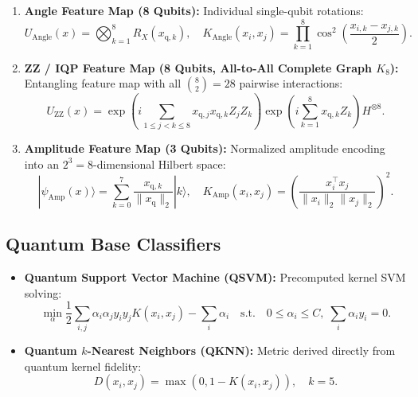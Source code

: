 \begin{enumerate}[leftmargin=*]
  \item \textbf{Angle Feature Map (8 Qubits):} Individual single-qubit rotations:
  \begin{equation}
  U_{\mathrm{Angle}}(x) = \bigotimes_{k=1}^8 R_X(x_{\mathrm{q}, k}), \quad K_{\mathrm{Angle}}(x_i, x_j) = \prod_{k=1}^8 \cos^2\left(\frac{x_{i, k} - x_{j, k}}{2}\right).
  \end{equation}
  \item \textbf{ZZ / IQP Feature Map (8 Qubits, All-to-All Complete Graph $K_8$):} Entangling feature map with all $\binom{8}{2}=28$ pairwise interactions:
  \begin{equation}
  U_{\mathrm{ZZ}}(x) = \exp\left(i \sum_{1 \le j < k \le 8} x_{\mathrm{q}, j} x_{\mathrm{q}, k} Z_j Z_k\right) \exp\left(i \sum_{k=1}^8 x_{\mathrm{q}, k} Z_k\right) H^{\otimes 8}.
  \end{equation}
  \item \textbf{Amplitude Feature Map (3 Qubits):} Normalized amplitude encoding into an $2^3 = 8$-dimensional Hilbert space:
  \begin{equation}
  |\psi_{\mathrm{Amp}}(x)\rangle = \sum_{k=0}^7 \frac{x_{\mathrm{q}, k}}{\|x_{\mathrm{q}}\|_2} |k\rangle, \quad K_{\mathrm{Amp}}(x_i, x_j) = \left(\frac{x_i^\top x_j}{\|x_i\|_2 \|x_j\|_2}\right)^2.
  \end{equation}
\end{enumerate}

\subsection{Quantum Base Classifiers}
\begin{itemize}[leftmargin=*]
  \item \textbf{Quantum Support Vector Machine (QSVM):} Precomputed kernel SVM solving:
  \begin{equation}
  \min_{\alpha} \frac{1}{2} \sum_{i,j} \alpha_i \alpha_j y_i y_j K(x_i, x_j) - \sum_i \alpha_i \quad \text{s.t.} \quad 0 \le \alpha_i \le C, \; \sum_i \alpha_i y_i = 0.
  \end{equation}
  \item \textbf{Quantum $k$-Nearest Neighbors (QKNN):} Metric derived directly from quantum kernel fidelity:
  \begin{equation}
  D(x_i, x_j) = \max(0, 1 - K(x_i, x_j)), \quad k = 5.
  \end{equation}
\end{itemize}

